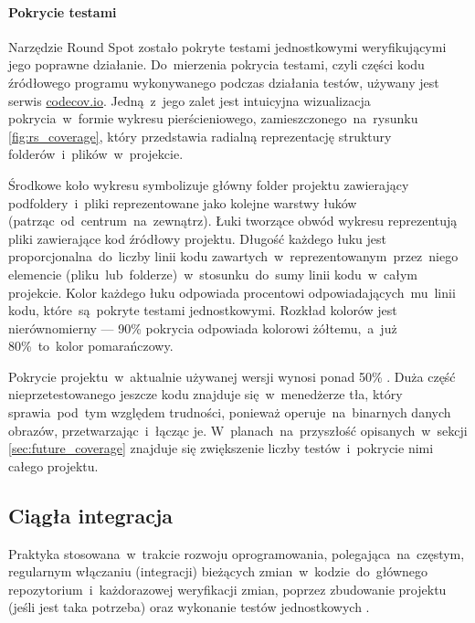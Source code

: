 \paragraph{Pokrycie testami}
\label{par:test_coverage}
Narzędzie Round Spot zostało pokryte testami jednostkowymi weryfikującymi jego poprawne działanie. Do~mierzenia pokrycia testami, czyli części kodu źródłowego programu wykonywanego podczas działania testów, używany jest serwis \href{https://codecov.io/}{codecov.io}. Jedną~z~jego zalet jest intuicyjna wizualizacja pokrycia~w~formie wykresu pierścieniowego, zamieszczonego~na~rysunku \ref{fig:rs_coverage}, który przedstawia radialną reprezentację struktury folderów~i~plików~w~projekcie. 

\bigskip
{}

Środkowe koło wykresu symbolizuje główny folder projektu zawierający podfoldery~i~pliki reprezentowane jako kolejne warstwy łuków (patrząc~od~centrum~na~zewnątrz). Łuki tworzące obwód wykresu reprezentują pliki zawierające kod źródłowy projektu. Długość każdego łuku jest proporcjonalna~do~liczby linii kodu zawartych~w~reprezentowanym~przez~niego elemencie (pliku~lub~folderze)~w~stosunku~do~sumy linii kodu~w~całym projekcie. Kolor każdego łuku odpowiada procentowi odpowiadających~mu~linii kodu, które~są~pokryte testami jednostkowymi. Rozkład kolorów jest nierównomierny --- 90\% pokrycia odpowiada kolorowi żółtemu,~a~już 80\%~to~kolor pomarańczowy. 

Pokrycie projektu~w~aktualnie używanej wersji wynosi ponad 50\% \cite{RS_Coverage}. Duża część nieprzetestowanego jeszcze kodu znajduje się~w~menedżerze tła, który sprawia~pod~tym względem trudności, ponieważ operuje~na~binarnych danych obrazów, przetwarzając~i~łącząc je. W~planach~na~przyszłość opisanych~w~sekcji \ref{sec:future_coverage} znajduje się zwiększenie liczby testów~i~pokrycie nimi całego projektu.

\subsection{Ciągła integracja}
\label{sec:rs_ci}
Praktyka stosowana~w~trakcie rozwoju oprogramowania, polegająca~na~częstym, regularnym włączaniu (integracji) bieżących zmian~w~kodzie~do~głównego repozytorium~i~każdorazowej weryfikacji zmian, poprzez zbudowanie projektu (jeśli jest taka potrzeba) oraz wykonanie testów jednostkowych \cite{CI_definition}.

